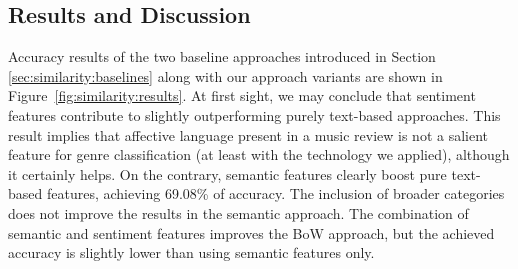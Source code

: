 

\subsection{Results and Discussion}
\label{sec:similarity:class:results}

Accuracy results of the two baseline approaches introduced in Section \ref{sec:similarity:baselines} along with our approach variants are shown in Figure~\ref{fig:similarity:results}. At first sight, we may conclude that sentiment features contribute to slightly outperforming purely text-based approaches. This result implies that affective language present in a music review is not a salient feature for genre classification (at least with the technology we applied), although it certainly helps. On the contrary, semantic features clearly boost pure text-based features, achieving 69.08\% of accuracy. The inclusion of broader categories does not improve the results in the semantic approach. The combination of semantic and sentiment features improves the BoW approach, but the achieved accuracy is slightly lower than using semantic features only.%

